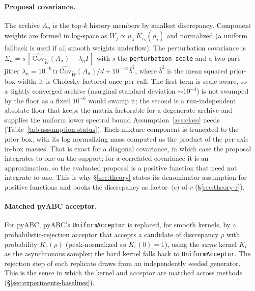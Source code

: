 \documentclass[pdflatex,sn-mathphys-num]{sn-jnl}
\theoremstyle{plain}
\theoremstyle{definition}
\begin{document}
\begin{appendices}
\paragraph{Proposal covariance.} The archive $A_n$ is the top-$k$ history members by smallest discrepancy. Component weights are formed in log-space as $\tilde W_j \propto w_j\,K_{\epsilon_n}(\rho_j)$ and normalized (a uniform fallback is used if all smooth weights underflow). The perturbation covariance is $\Sigma_n = s\,[\,\widehat{\mathrm{Cov}}_{\tilde W}(A_n) + \lambda_n I\,]$ with $s$ the \texttt{perturbation\_scale} and a two-part jitter $\lambda_n = 10^{-9}\,\mathrm{tr}\,\widehat{\mathrm{Cov}}_{\tilde W}(A_n)/d + 10^{-12}\,\bar b^2$, where $\bar b^2$ is the mean squared prior-box width; it is Cholesky-factored once per call. The first term is scale-aware, so a tightly converged archive (marginal standard deviation ${\sim}10^{-4}$) is not swamped by the floor as a fixed $10^{-6}$ would swamp it; the second is a run-independent absolute floor that keeps the matrix factorable for a degenerate archive and supplies the uniform lower spectral bound Assumption~\ref{ass:class} needs (Table~\ref{tab:assumption-status}). Each mixture component is truncated to the prior box, with its log normalizing mass computed as the product of the per-axis in-box masses. That is exact for a diagonal covariance, in which case the proposal integrates to one on the support; for a correlated covariance it is an approximation, so the evaluated proposal is a positive function that need not integrate to one. This is why \S\ref{sec:theory} states its denominator assumption for positive functions and books the discrepancy as factor~(c) of $r$ (\S\ref{sec:theory-r}).

\paragraph{Matched pyABC acceptor.} For pyABC, pyABC's \texttt{UniformAcceptor} is replaced, for smooth kernels, by a probabilistic-rejection acceptor that accepts a candidate of discrepancy $\rho$ with probability $K_{\epsilon}(\rho)$ (peak-normalized so $K_{\epsilon}(0)=1$), using the \emph{same} kernel $K_{\epsilon}$ as the asynchronous sampler; the hard kernel falls back to \texttt{UniformAcceptor}. The rejection step of each replicate draws from an independently seeded generator. This is the sense in which the kernel and acceptor are matched across methods (\S\ref{sec:experiments-baselines}).


\end{appendices}
\end{document}

